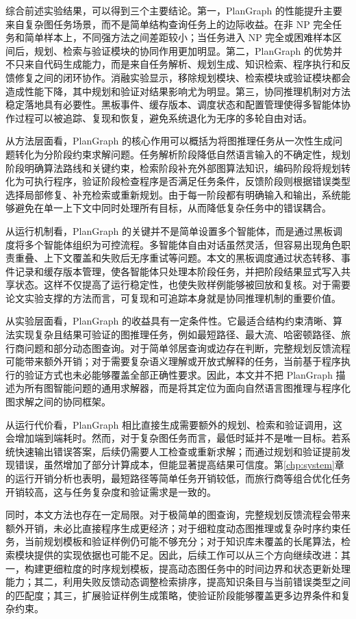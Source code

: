 综合前述实验结果，可以得到三个主要结论。第一，PlanGraph 的性能提升主要来自复杂图任务场景，而不是简单结构查询任务上的边际收益。在非 NP 完全任务和简单样本上，不同强方法之间差距较小；当任务进入 NP 完全或困难样本区间后，规划、检索与验证模块的协同作用更加明显。第二，PlanGraph 的优势并不只来自代码生成能力，而是来自任务解析、规划生成、知识检索、程序执行和反馈修复之间的闭环协作。消融实验显示，移除规划模块、检索模块或验证模块都会造成性能下降，其中规划和验证对结果影响尤为明显。第三，协同推理机制对方法稳定落地具有必要性。黑板事件、缓存版本、调度状态和配置管理使得多智能体协作过程可以被追踪、复现和恢复，避免系统退化为无序的多轮自由对话。

从方法层面看，PlanGraph 的核心作用可以概括为将图推理任务从一次性生成问题转化为分阶段约束求解问题。任务解析阶段降低自然语言输入的不确定性，规划阶段明确算法路线和关键约束，检索阶段补充外部图算法知识，编码阶段将规划转化为可执行程序，验证阶段检查程序是否满足任务条件，反馈阶段则根据错误类型选择局部修复、补充检索或重新规划。由于每一阶段都有明确输入和输出，系统能够避免在单一上下文中同时处理所有目标，从而降低复杂任务中的错误耦合。

从运行机制看，PlanGraph 的关键并不是简单设置多个智能体，而是通过黑板调度将多个智能体组织为可控流程。多智能体自由对话虽然灵活，但容易出现角色职责重叠、上下文覆盖和失败后无序重试等问题。本文的黑板调度通过状态转移、事件记录和缓存版本管理，使各智能体只处理本阶段任务，并把阶段结果显式写入共享状态。这样不仅提高了运行稳定性，也使失败样例能够被回放和复核。对于需要论文实验支撑的方法而言，可复现和可追踪本身就是协同推理机制的重要价值。

从实验层面看，PlanGraph 的收益具有一定条件性。它最适合结构约束清晰、算法实现复杂且结果可验证的图推理任务，例如最短路径、最大流、哈密顿路径、旅行商问题和部分动态图查询。对于简单邻居查询或边存在判断，完整规划反馈流程可能带来额外开销；对于需要复杂语义理解或开放式解释的任务，当前基于程序执行的验证方式也未必能够覆盖全部正确性要求。因此，本文并不把 PlanGraph 描述为所有图智能问题的通用求解器，而是将其定位为面向自然语言图推理与程序化图求解之间的协同框架。

从运行代价看，PlanGraph 相比直接生成需要额外的规划、检索和验证调用，这会增加端到端耗时。然而，对于复杂图任务而言，最低时延并不是唯一目标。若系统快速输出错误答案，后续仍需要人工检查或重新求解；而通过规划和验证提前发现错误，虽然增加了部分计算成本，但能显著提高结果可信度。第\ref{chp:system}章的运行开销分析也表明，最短路径等简单任务开销较低，而旅行商等组合优化任务开销较高，这与任务复杂度和验证需求是一致的。

同时，本文方法也存在一定局限。对于极简单的图查询，完整规划反馈流程会带来额外开销，未必比直接程序生成更经济；对于细粒度动态图推理或复杂时序约束任务，当前规划模板和验证样例仍可能不够充分；对于知识库未覆盖的长尾算法，检索模块提供的实现依据也可能不足。因此，后续工作可以从三个方向继续改进：其一，构建更细粒度的时序规划模板，提高动态图任务中的时间边界和状态更新处理能力；其二，利用失败反馈动态调整检索排序，提高知识条目与当前错误类型之间的匹配度；其三，扩展验证样例生成策略，使验证阶段能够覆盖更多边界条件和复杂约束。

